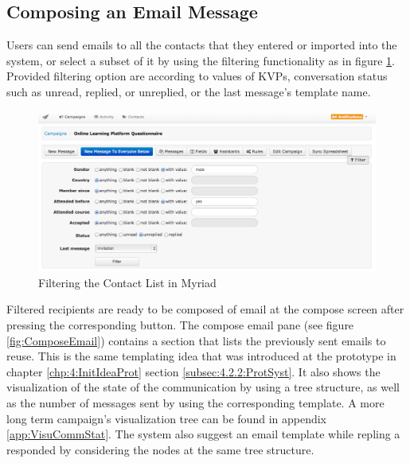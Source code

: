 \subsection{Composing an Email Message}
\label{subsec:5.2.4:CompEmaiMess}

Users can send emails to all the contacts that they entered or imported into the system, or select a subset of it by using the filtering functionality as in figure \ref{fig:ContactFilters}. Provided filtering option are according to values of \ac{KVP}s, conversation status such as unread, replied, or unreplied, or the last message's template name.

\begin{figure}[htbp]
	\centering
	\includegraphics[width=1.00\textwidth]{imgs/ContactFilters.png}
	\caption[Filtering the Contact List in Myriad]{Filtering the Contact List in Myriad}
	\label{fig:ContactFilters}
\end{figure}

Filtered recipients are ready to be composed of email at the compose screen after pressing the corresponding button. The compose email pane (see figure \ref{fig:ComposeEmail}) contains a section that lists the previously sent emails to reuse. This is the same templating idea that was introduced at the prototype in chapter \ref{chp:4:InitIdeaProt} section \ref{subsec:4.2.2:ProtSyst}. It also shows the visualization of the state of the communication by using a tree structure, as well as the number of messages sent by using the corresponding template. A more long term campaign's visualization tree can be found in appendix \ref{app:VisuCommStat}. The system also suggest an email template while repling a responded by considering the nodes at the same tree structure.

